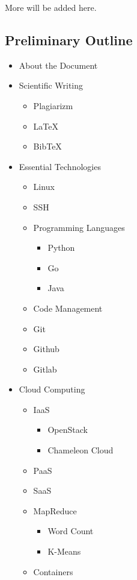 More will be added here.

\subsection{Preliminary Outline}\label{preliminary-outline}

\begin{itemize}
\item About the Document
\item Scientific Writing

  \begin{itemize}
  \tightlist
  \item   Plagiarizm
  \item   LaTeX
  \item   BibTeX
  \end{itemize}
\item Essential Technologies

  \begin{itemize}
  \item   Linux
  \item   SSH
  \item   Programming Languages

    \begin{itemize}
    \tightlist
    \item     Python
    \item     Go
    \item     Java
    \end{itemize}
  \item   Code Management
  \item   Git
  \item   Github
  \item   Gitlab
  \end{itemize}
\item Cloud Computing

  \begin{itemize}
  \item   IaaS

    \begin{itemize}
    \item     OpenStack
    \item     Chameleon Cloud
    \end{itemize}
  \item   PaaS
  \item   SaaS
  \item   MapReduce

    \begin{itemize}
    \tightlist
    \item     Word Count
    \item     K-Means
    \end{itemize}
  \item   Containers


\end{itemize}
\end{itemize}
